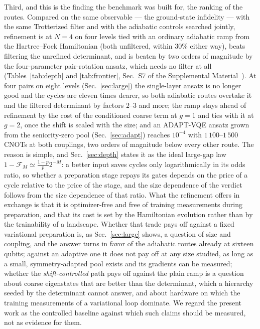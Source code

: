 \documentclass[
  aps,            %
  prc,            %
  reprint,        %
  superscriptaddress,
  floatfix,
  nofootinbib
]{revtex4-2}
\newcommand{\SM}{Supplemental Material~\cite{SM}}
\begin{document}
Third, and this is the finding the benchmark was built for, the ranking of
the routes.  Compared on the same observable --- the ground-state
infidelity --- with the same Trotterized filter and with the adiabatic
controls searched jointly, refinement is at $N=4$ on four levels tied with
an ordinary adiabatic ramp from the Hartree--Fock Hamiltonian (both
unfiltered, within $30\%$ either way), beats filtering the unrefined
determinant, and is beaten by two orders of magnitude by the
four-parameter pair-rotation ansatz, which needs no filter at all
(Tables~\ref{tab:depth} and \ref{tab:frontier}, Sec.~S7 of the \SM{}).  At
four pairs on eight levels (Sec.~\ref{sec:large}) the single-layer ansatz
is no longer good and the cycles are eleven times dearer, so both
adiabatic routes overtake it and the filtered determinant by factors
$2$--$3$ and more; the ramp stays ahead of refinement by the cost of the
conditioned coarse term at $g=1$ and ties with it at $g=2$, once the shift
is scaled with the size; and an ADAPT-VQE ansatz grown from the
seniority-zero pool (Sec.~\ref{sec:adapt}) reaches $10^{-4}$ with
$1\,100$--$1\,500$ CNOTs at both couplings, two orders of magnitude below
every other route.  The reason is simple, and
Sec.~\ref{sec:depth} states it as the ideal large-gap law
$1-\mathcal F_M\simeq\tfrac{1-p}{p}2^{-M}$: a better input saves cycles only
logarithmically in its odds ratio, so whether a preparation stage repays its
gates depends on the price of a cycle relative to the price of the stage,
and the size dependence of the verdict follows from the size dependence of
that ratio.  What the refinement offers in exchange is that it is
optimizer-free and free of training measurements during preparation, and that its cost is
set by the Hamiltonian evolution rather than by the trainability of a
landscape.  Whether that trade pays off against a fixed variational preparation
is, as Sec.~\ref{sec:large} shows, a question of size and coupling, and the
answer turns in favor of the adiabatic routes already at sixteen qubits;
against an adaptive one it does not pay off at any size studied, as long as
a small, symmetry-adapted pool exists and its gradients can be measured;
whether the \emph{shift-controlled} path pays off against the plain ramp is
a question about coarse eigenstates that are better than the determinant,
which a hierarchy seeded by the determinant cannot answer, and about
hardware on which the training measurements of a variational loop
dominate.  We regard the present work as the controlled baseline against
which such claims should be measured, not as evidence for them.
\end{document}
